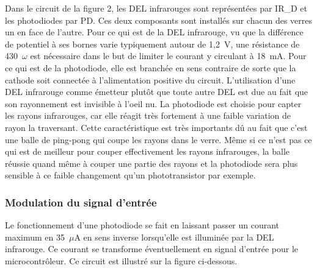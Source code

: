 
Dans le circuit de la figure 2, les DEL infrarouges sont représentées par IR\_D et les photodiodes par PD.
Ces deux composants sont installés sur chacun des verres un en face de l’autre.
Pour ce qui est de la DEL infrarouge, vu que la différence de potentiel à ses bornes varie typiquement autour de 1,2~V, une résistance de 430~$\omega$ est nécessaire dans le but de limiter le courant y circulant à 18~mA.
Pour ce qui est de la photodiode, elle est branchée en sens contraire de sorte que la cathode soit connectée à l’alimentation positive du circuit.
L’utilisation d’une DEL infrarouge comme émetteur plutôt que toute autre DEL est due au fait que son rayonnement est invisible à l'oeil nu.
La photodiode est choisie pour capter les rayons infrarouges, car elle réagit très fortement à une faible variation de rayon la traversant.
Cette caractéristique est très importants dû au fait que c’est une balle de ping-pong qui coupe les rayons dans le verre.
Même si ce n’est pas ce qui est de meilleur pour couper effectivement les rayons infrarouges, la balle réussie quand même à couper une partie des rayons et la photodiode sera plus sensible à ce faible changement qu’un phototransistor par exemple.

\subsubsection{Modulation du signal d’entrée}

Le fonctionnement d’une photodiode se fait en laissant passer un courant maximum en 35~$\mu$A en sens inverse lorsqu’elle est illuminée par la DEL infrarouge.
Ce courant se transforme éventuellement en signal d’entrée pour le microcontrôleur.
Ce circuit est illustré sur la figure ci-dessous.


